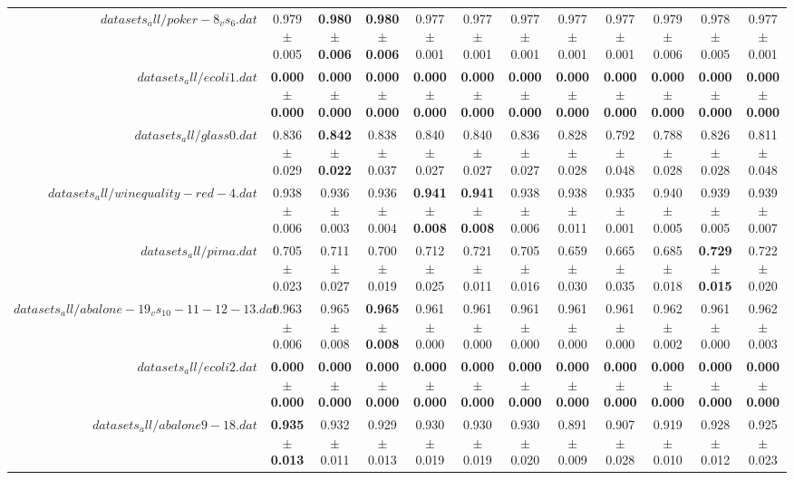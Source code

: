 \begin{table}[!ht]
{\begin{tabular}{r c c c c c c c c c c c}
$datasets_all/poker-8_vs_6.dat$ & 0.979 $\pm$ 0.005 & \textbf{0.980 $\pm$ 0.006} & \textbf{0.980 $\pm$ 0.006} & 0.977 $\pm$ 0.001 & 0.977 $\pm$ 0.001 & 0.977 $\pm$ 0.001 & 0.977 $\pm$ 0.001 & 0.977 $\pm$ 0.001 & 0.979 $\pm$ 0.006 & 0.978 $\pm$ 0.005 & 0.977 $\pm$ 0.001 \\
$datasets_all/ecoli1.dat$ & \textbf{0.000 $\pm$ 0.000} & \textbf{0.000 $\pm$ 0.000} & \textbf{0.000 $\pm$ 0.000} & \textbf{0.000 $\pm$ 0.000} & \textbf{0.000 $\pm$ 0.000} & \textbf{0.000 $\pm$ 0.000} & \textbf{0.000 $\pm$ 0.000} & \textbf{0.000 $\pm$ 0.000} & \textbf{0.000 $\pm$ 0.000} & \textbf{0.000 $\pm$ 0.000} & \textbf{0.000 $\pm$ 0.000} \\
$datasets_all/glass0.dat$ & 0.836 $\pm$ 0.029 & \textbf{0.842 $\pm$ 0.022} & 0.838 $\pm$ 0.037 & 0.840 $\pm$ 0.027 & 0.840 $\pm$ 0.027 & 0.836 $\pm$ 0.027 & 0.828 $\pm$ 0.028 & 0.792 $\pm$ 0.048 & 0.788 $\pm$ 0.028 & 0.826 $\pm$ 0.028 & 0.811 $\pm$ 0.048 \\
$datasets_all/winequality-red-4.dat$ & 0.938 $\pm$ 0.006 & 0.936 $\pm$ 0.003 & 0.936 $\pm$ 0.004 & \textbf{0.941 $\pm$ 0.008} & \textbf{0.941 $\pm$ 0.008} & 0.938 $\pm$ 0.006 & 0.938 $\pm$ 0.011 & 0.935 $\pm$ 0.001 & 0.940 $\pm$ 0.005 & 0.939 $\pm$ 0.005 & 0.939 $\pm$ 0.007 \\
$datasets_all/pima.dat$ & 0.705 $\pm$ 0.023 & 0.711 $\pm$ 0.027 & 0.700 $\pm$ 0.019 & 0.712 $\pm$ 0.025 & 0.721 $\pm$ 0.011 & 0.705 $\pm$ 0.016 & 0.659 $\pm$ 0.030 & 0.665 $\pm$ 0.035 & 0.685 $\pm$ 0.018 & \textbf{0.729 $\pm$ 0.015} & 0.722 $\pm$ 0.020 \\
$datasets_all/abalone-19_vs_10-11-12-13.dat$ & 0.963 $\pm$ 0.006 & 0.965 $\pm$ 0.008 & \textbf{0.965 $\pm$ 0.008} & 0.961 $\pm$ 0.000 & 0.961 $\pm$ 0.000 & 0.961 $\pm$ 0.000 & 0.961 $\pm$ 0.000 & 0.961 $\pm$ 0.000 & 0.962 $\pm$ 0.002 & 0.961 $\pm$ 0.000 & 0.962 $\pm$ 0.003 \\
$datasets_all/ecoli2.dat$ & \textbf{0.000 $\pm$ 0.000} & \textbf{0.000 $\pm$ 0.000} & \textbf{0.000 $\pm$ 0.000} & \textbf{0.000 $\pm$ 0.000} & \textbf{0.000 $\pm$ 0.000} & \textbf{0.000 $\pm$ 0.000} & \textbf{0.000 $\pm$ 0.000} & \textbf{0.000 $\pm$ 0.000} & \textbf{0.000 $\pm$ 0.000} & \textbf{0.000 $\pm$ 0.000} & \textbf{0.000 $\pm$ 0.000} \\
$datasets_all/abalone9-18.dat$ & \textbf{0.935 $\pm$ 0.013} & 0.932 $\pm$ 0.011 & 0.929 $\pm$ 0.013 & 0.930 $\pm$ 0.019 & 0.930 $\pm$ 0.019 & 0.930 $\pm$ 0.020 & 0.891 $\pm$ 0.009 & 0.907 $\pm$ 0.028 & 0.919 $\pm$ 0.010 & 0.928 $\pm$ 0.012 & 0.925 $\pm$ 0.023 \\

\end{tabular}}
\end{table}

